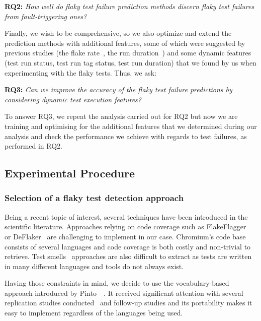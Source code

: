 \begin{description}
    \item \textbf{\textsc{RQ2:}} \emph{How well do flaky test failure prediction methods discern flaky test failures from fault-triggering ones?}
\end{description}

Finally, we wish to be comprehensive, so we also optimize and extend the prediction methods with additional features, some of which were suggested by previous studies (the flake rate~\cite{Kowalczyk2020}, the run duration~\cite{FlakeFlagger}) and some dynamic features (test run status, test run tag status, test run duration) that we found by us when experimenting with the flaky tests. Thus, we ask:

\begin{description}
    \item \textbf{\textsc{RQ3:}} \emph{Can we improve the accuracy of the flaky test failure predictions by considering dynamic test execution features?}
\end{description}


To answer RQ3, we repeat the analysis carried out for RQ2 but now we are training and optimising for the additional features that we determined during our analysis and check the performance we achieve with regards to test failures, as performed in RQ2. 


\subsection{Experimental Procedure}

\subsubsection{Selection of a flaky test detection approach} 
\label{sec:evaluationSelection}
Being a recent topic of interest, several techniques have been introduced in the scientific literature. Approaches relying on code coverage such as FlakeFlagger~\cite{FlakeFlagger} or DeFlaker~\cite{Bell2018} are challenging to implement in our case. Chromium's code base consists of several languages and code coverage is both costly and non-trivial to retrieve. Test smells~\cite{camara2021use} approaches are also difficult to extract as tests are written in many different languages and tools do not always exist. 

Having those constraints in mind, we decide to use the vocabulary-based approach introduced by Pinto~\etal ~\cite{Pinto2020}. It received significant attention with several replication studies conducted~\cite{Haben2021,Camara2021VocabExtendedReplication} and follow-up studies and its portability makes it easy to implement regardless of the languages being used.

